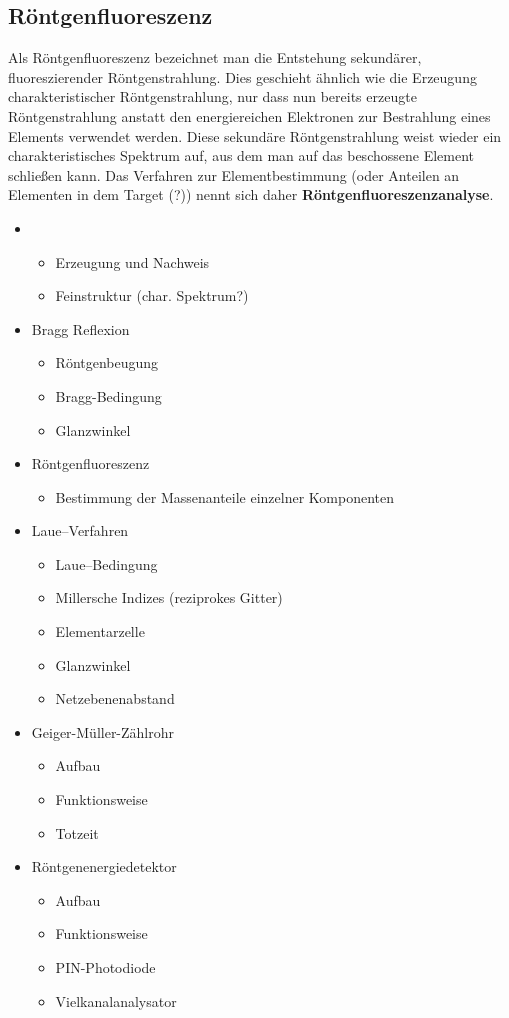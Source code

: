 \documentclass[10pt, a4paper]{article}
\begin{document}
\subsection{Röntgenfluoreszenz}
  Als Röntgenfluoreszenz bezeichnet man die Entstehung sekundärer, fluoreszierender Röntgenstrahlung.
  Dies geschieht ähnlich wie die Erzeugung charakteristischer Röntgenstrahlung, nur dass nun bereits erzeugte Röntgenstrahlung anstatt den energiereichen Elektronen zur Bestrahlung eines Elements verwendet werden.
  Diese sekundäre Röntgenstrahlung weist wieder ein charakteristisches Spektrum auf, aus dem man auf das beschossene Element schließen kann.
  Das Verfahren zur Elementbestimmung (oder Anteilen an Elementen in dem Target (?)) nennt sich daher \textbf{Röntgenfluoreszenzanalyse}.
\begin{itemize}
\item
  \begin{itemize}
    \item Erzeugung und Nachweis
    \item Feinstruktur (char. Spektrum?)
  \end{itemize}
  \item Bragg Reflexion
  \begin{itemize}
    \item Röntgenbeugung
    \item Bragg-Bedingung
    \item Glanzwinkel
  \end{itemize}
  \item Röntgenfluoreszenz
  \begin{itemize}
    \item Bestimmung der Massenanteile einzelner Komponenten
  \end{itemize}
  \item Laue--Verfahren
  \begin{itemize}
    \item Laue--Bedingung
    \item Millersche Indizes (reziprokes Gitter)
    \item Elementarzelle
    \item Glanzwinkel
    \item Netzebenenabstand
  \end{itemize}
  \item Geiger-Müller-Zählrohr
  \begin{itemize}
    \item Aufbau
    \item Funktionsweise
    \item Totzeit
  \end{itemize}
  \item Röntgenenergiedetektor
  \begin{itemize}
    \item Aufbau
    \item Funktionsweise
    \item PIN-Photodiode
    \item Vielkanalanalysator
  \end{itemize}
\end{itemize}
\end{document}
